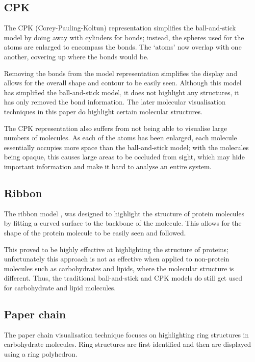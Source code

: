 \documentclass[twocolumn,a4paper]{article}
\begin{document}
\subsection*{CPK}
The CPK (Corey-Pauling-Koltun) \citep{corey53} representation simplifies the
ball-and-stick model by doing away with cylinders for bonds; instead, the
spheres used for the atoms are enlarged to encompass the bonds. The `atoms' now
overlap with one another, covering up where the bonds would be.

Removing the bonds from the model representation simplifies the display and
allows for the overall shape and contour to be easily seen. Although this model
has simplified the ball-and-stick model, it does not highlight any structures,
it has only removed the bond information. The later molecular visualisation
techniques in this paper do highlight certain molecular structures.

The CPK representation also suffers from not being able to visualise large
numbers of molecules. As each of the atoms has been enlarged, each molecule
essentially occupies more space than the ball-and-stick model; with the
molecules being opaque, this causes large areas to be occluded from sight, which
may hide important information and make it hard to analyse an entire system.

\subsection*{Ribbon}
The ribbon model \citep{richardson81}, \citep{carson87} was designed to
highlight the structure of protein molecules by fitting a curved surface to the
backbone of the molecule. This allows for the shape of the protein molecule to
be easily seen and followed.

This proved to be highly effective at highlighting the structure of proteins;
unfortunately this approach is not as effective when applied to non-protein
molecules such as carbohydrates and lipids, where the molecular structure is
different. Thus, the traditional ball-and-stick and CPK models do still get
used for carbohydrate and lipid molecules.

\subsection*{Paper chain}
The paper chain visualisation technique \citep{kuttel06} focuses on highlighting
ring structures in carbohydrate molecules. Ring structures are first identified
and then are displayed using a ring polyhedron.
\end{document}
